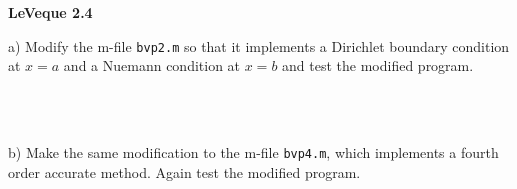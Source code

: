 \textbf{LeVeque 2.4} 

a) Modify the m-file \texttt{bvp2.m} so that it implements a Dirichlet boundary condition at $x = a$ and a Nuemann
   condition at $x = b$ and test the modified program.

\begin{solution}\ \\\\
\end{solution}

\pagebreak
b) Make the same modification to the m-file \texttt{bvp4.m}, which implements a fourth order accurate method. Again test
   the modified program.

\begin{solution}\ \\\\
\end{solution}